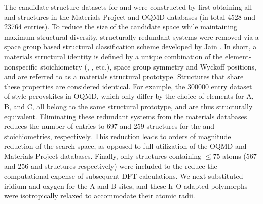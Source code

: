 %
%
%
The candidate structure datasets for \IrOtwo and \IrOthree were constructed by first obtaining all \ABtwo and \ABthree structures in the Materials Project\cite{Jain2013} and OQMD\cite{Kirklin2015} databases
(in total \num{4528} \ABtwo and \num{23764} \ABthree entries).
%
To reduce the size of the candidate space while maintaining maximum structural diversity, structurally redundant systems were removed via a space group based structural classification scheme developed by Jain  \cite{Jain2018}.
%
In short, a materials structural identity is defined by a unique combination of the element-nonspecific stoichiometry (\ABtwo, \ABthree, etc.), space group symmetry and Wyckoff positions, and are referred to as a materials structural prototype.
%
Structures that share these properties are considered identical.
%
For example, the \num{300000} entry dataset of \ABOthree style perovskites in OQMD, which only differ by the choice of elements for A, B, and C, all belong to the same structural prototype, and are thus structurally equivalent.
%
Eliminating these redundant systems from the materials databases reduces the number of entries to \num{697} and \num{259} structures for the \ABtwo and \ABthree stoichiometries, respectively.
%
This reduction leads to orders of magnitude reduction of the search space, as opposed to full utilization of the OQMD and Materials Project databases.
%
Finally, only structures containing $\leq\num{75}$ atoms
(\num{567} and \num{256} \ABtwo and \ABthree structures respectively)
were included to the reduce the computational expense of subsequent DFT calculations.
%
We next substituted iridium and oxygen for the A and B sites, and these Ir-O adapted polymorphs were isotropically relaxed to accommodate their atomic radii.
